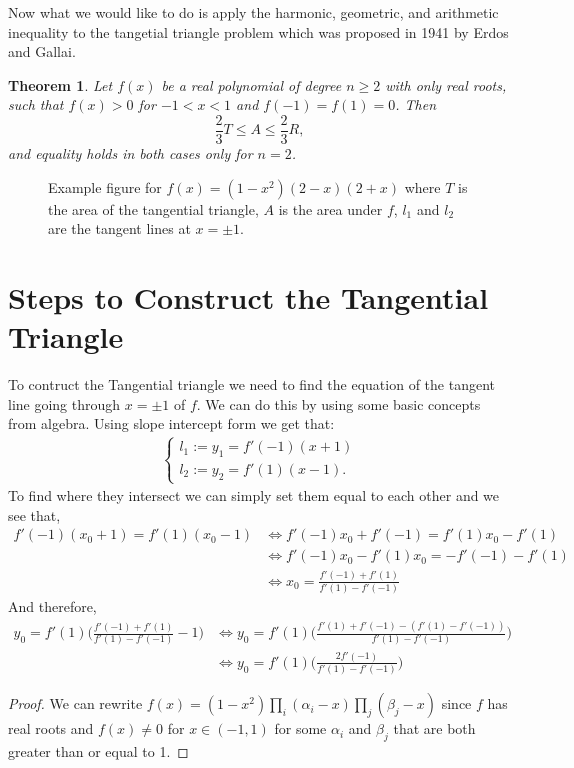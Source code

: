 \documentclass[12pt]{extreport}
\newtheorem*{thm}{Theorem}
\begin{document}
Now what we would like to do is apply the harmonic, geometric, and arithmetic inequality to the tangetial triangle problem which was proposed in 1941 by Erdos and Gallai.
\begin{thm}
Let $f(x)$ be a real polynomial of degree $n\geq 2$ with only real roots, such that $f(x)>0$ for $-1<x<1$ and $f(-1) = f(1) = 0$. Then $$\frac{2}{3}T \leq A \leq \frac{2}{3}R,$$ and equality holds in both cases only for $n = 2$.
\end{thm}
\begin{figure}[H]
\centering
\caption{Example figure for $f(x) = (1 - x^2) (2 - x) (2 + x)$ where $T$ is the area of the tangential triangle, $A$ is the area under $f$, $l_1$ and $l_2$ are the tangent lines at $x = \pm 1$.}
\end{figure}
\section*{Steps to Construct the Tangential Triangle}
To contruct the Tangential triangle we need to find the equation of the tangent line going through $x = \pm 1$ of $f$. We can do this by using some basic concepts from algebra. Using slope intercept form we get that:
\begin{align*}
\left\{ \begin{array}{lr} l_1 := y_1 = f'(-1)(x+1) \\ l_2 := y_2 = f'(1)(x-1).\end{array} \right.
\end{align*}
To find where they intersect we can simply set them equal to each other and we see that,
\begin{align*}
f'(-1)(x_0+1) = f'(1)(x_0-1) &\iff f'(-1)x_0 + f'(-1) = f'(1)x_0 - f'(1) \\&\iff f'(-1)x_0 - f'(1)x_0 = -f'(-1) - f'(1) \\&\iff x_0 = \frac{f'(-1)+ f'(1)}{f'(1) - f'(-1)} 
\end{align*}
And therefore,
\begin{align*}
y_0 = f'(1) \Big(\frac{f'(-1)+ f'(1)}{f'(1) - f'(-1)} - 1\Big) &\iff
y_0 = f'(1) \Big(\frac{f'(1) + f'(-1) - (f'(1) - f'(-1))}{f'(1)-f'(-1)}\Big) \\&\iff
y_0 = f'(1)\Big(\frac{2f'(-1)}{f'(1)-f'(-1)}\Big)
\end{align*}

\begin{proof}
We can rewrite $f(x) = (1-x^2) \prod_{i}(\alpha_i - x) \prod_{j}(\beta_j - x)$ since $f$ has real roots and $f(x) \neq 0$ for $x \in (-1, 1)$ for some $\alpha_{i}$ and $\beta_{j}$ that are both greater than or equal to 1.
\end{proof}
\end{document}
